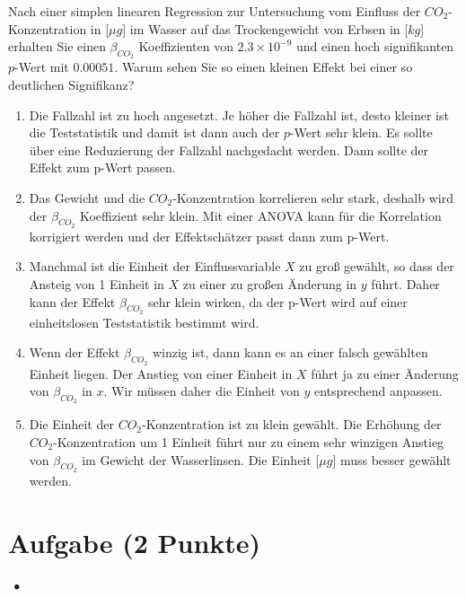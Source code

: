\documentclass[a4paper, 9pt]{scrartcl}\usepackage[]{graphicx}\usepackage[]{xcolor}
\begin{document}
Nach einer simplen linearen Regression zur Untersuchung vom Einfluss der $CO_2$-Konzentration in [$\mu g$] im Wasser auf das Trockengewicht von Erbsen in [$kg$] erhalten Sie einen $\beta_{CO_2}$ Koeffizienten von $2.3\times 10^{-9}$ und einen hoch signifikanten $p$-Wert mit $0.00051$. Warum sehen Sie so einen kleinen Effekt bei einer so deutlichen Signifikanz?




\begin{enumerate}
\item [\textbf{A} \msquare] Die Fallzahl ist zu hoch angesetzt. Je höher die Fallzahl ist, desto kleiner ist die Teststatistik und damit ist dann auch der $p$-Wert sehr klein. Es sollte über eine Reduzierung der Fallzahl nachgedacht werden. Dann sollte der Effekt zum p-Wert passen.
\item [\textbf{B} \msquare] Das Gewicht und die $CO_2$-Konzentration korrelieren sehr stark, deshalb wird der $\beta_{CO_2}$ Koeffizient sehr klein. Mit einer ANOVA kann für die Korrelation korrigiert werden und der Effektschätzer passt dann zum p-Wert.
\item [\textbf{C} \msquare] Manchmal ist die Einheit der Einflussvariable $X$ zu groß gewählt, so dass der Ansteig von 1 Einheit in $X$ zu einer zu großen Änderung in $y$ führt. Daher kann der Effekt $\beta_{CO_2}$ sehr klein wirken, da der p-Wert wird auf einer einheitslosen Teststatistik bestimmt wird.
\item [\textbf{D} \msquare] Wenn der Effekt $\beta_{CO_2}$ winzig ist, dann kann es an einer falsch gewählten Einheit liegen. Der Anstieg von einer Einheit in $X$ führt ja zu einer Änderung von $\beta_{CO_2}$ in $x$. Wir müssen daher die Einheit von $y$ entsprechend anpassen.
\item [\textbf{E} \msquare] Die Einheit der $CO_2$-Konzentration ist zu klein gewählt. Die Erhöhung der $CO_2$-Konzentration um 1 Einheit führt nur zu einem sehr winzigen Anstieg von $\beta_{CO_2}$ im Gewicht der Wasserlinsen. Die Einheit [$\mu g$] muss besser gewählt werden.
\end{enumerate}

\section{Aufgabe \hfill (2 Punkte)}

\ifcollection
\begin{flushright}
\tiny\vspace{-2Ex}
\textbf{\examinhaltstart}
\exammodulestatversuch $\;\bullet$
\exammodulebiostat
\vspace{-1Ex}
\end{flushright}
\fi
\end{document}
